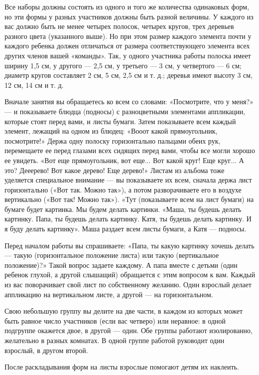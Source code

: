 \documentclass[a5paper]{book}
\begin{document}
Все наборы должны состоять из одного и того же количества одинаковых
форм, но эти формы у разных участников должны быть разной величины. У
каждого из вас должно быть не менее четырех полосок, четырех кругов,
трех деревьев разного цвета (указанного выше). Но при этом размер
каждого элемента почти у каждого ребенка должен отличаться от размера
соответствующего элемента всех других членов вашей «команды». Так, у
одного участника работы полоска имеет ширину 1,5 см, у другого --- 2,5
см, у третьего --- 3 см, у четвертого --- 6 см; диаметр кругов
составляет 2 см, 5 см, 2,5 см и т. д.; деревья имеют высоту 3 см, 12 см,
14 см и т. д.

Вначале занятия вы обращаетесь ко всем со словами: «Посмотрите, что у
меня?» --- и показываете блюдца (подносы) с разноцветными элементами
аппликации, которые стоят перед вами, и листы бумаги. Затем показываете
всем каждый элемент, лежащий на одном из блюдец: «Вооот какой
прямоугольник, посмотрите!» Держа одну полоску горизонтально пальцами
обеих рук, перемещаете ее перед глазами всех сидящих перед вами, чтобы
все могли хорошо ее увидеть. «Вот еще прямоугольник, вот еще... Вот
какой круг! Еще круг... А это? Дееерево! Вот какое дерево! Еще дерево!»
Листам из альбома тоже уделяется специальное внимание --- вы показываете
их всем, сначала держа лист горизонтально («Вот так. Можно так»), а
потом разворачиваете его в воздухе вертикально («Вот так! Можно так»).
«Тут (показываете всем на лист бумаги) на бумаге будет картинка. Мы
будем делать картинки. «Маша, ты будешь делать картинку. Папа, ты будешь
делать картинку. Катя, ты будешь делать картинку. И я буду делать
картинку». Маша раздает всем листы бумаги, а Катя --- подносы.

Перед началом работы вы спрашиваете: «Папа, ты какую картинку хочешь
делать --- такую (горизонтальное положение листа) или такую
(вертикальное положение)?» Такой вопрос задаете каждому. А папа вместе с
детьми (один ребенок глухой, а другой слышащий) обращается с этим
вопросом к вам. Каждый из вас поворачивает свой лист по собственному
желанию. Один взрослый делает аппликацию на вертикальном листе, а другой
--- на горизонтальном.

Свою небольшую группу вы делите на две части, в каждом из которых может
быть равное число участников (если вас четверо) или неравное: в одной
подгруппе окажется двое, в другой --- один. Обе группы работают
изолированно, желательно в разных комнатах. В одной группе работой
руководит один взрослый, в другом второй.

После раскладывания форм на листы взрослые помогают детям их наклеить.
\end{document}
